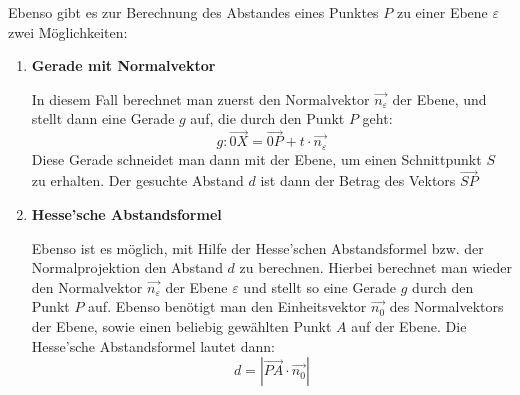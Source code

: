 
Ebenso gibt es zur Berechnung des Abstandes eines Punktes $P$ zu einer Ebene $\varepsilon$ zwei M\"{o}glichkeiten:

\begin{enumerate}
  \item{\textbf{Gerade mit Normalvektor}}

  In diesem Fall berechnet man zuerst den Normalvektor $\vec{n_{\varepsilon}}$ der Ebene, und stellt dann eine Gerade $g$ auf, die durch den Punkt $P$ geht: $$g: \vec{0X} = \vec{0P} + t \cdot \vec{n_{\varepsilon}}$$ Diese Gerade schneidet man dann mit der Ebene, um einen Schnittpunkt $S$ zu erhalten. Der gesuchte Abstand $d$ ist dann der Betrag des Vektors $\vec{SP}$

  \item{\textbf{Hesse'sche Abstandsformel}}

  Ebenso ist es m\"{o}glich, mit Hilfe der Hesse'schen Abstandsformel bzw. der Normalprojektion den Abstand $d$ zu berechnen. Hierbei berechnet man wieder den Normalvektor $\vec{n_{\varepsilon}}$ der Ebene $\varepsilon$ und stellt so eine Gerade $g$ durch den Punkt $P$ auf. Ebenso ben\"{o}tigt man den Einheitsvektor $\vec{n_{0}}$ des Normalvektors der Ebene, sowie einen beliebig gew\"{a}hlten Punkt $A$ auf der Ebene. Die Hesse'sche Abstandsformel lautet dann: $$d = |\vec{PA} \cdot \vec{n_{0}}|$$

\end{enumerate}


